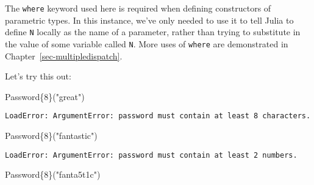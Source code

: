 \documentclass[
  letterpaper,
  DIV=11,
  numbers=noendperiod]{scrreprt}
\newenvironment{Shaded}{\begin{snugshade}}{\end{snugshade}}
\newcommand{\DataTypeTok}[1]{\textcolor[rgb]{0.68,0.00,0.00}{#1}}
\newcommand{\FunctionTok}[1]{\textcolor[rgb]{0.28,0.35,0.67}{#1}}
\newcommand{\NormalTok}[1]{\textcolor[rgb]{0.00,0.23,0.31}{#1}}
\newcommand{\StringTok}[1]{\textcolor[rgb]{0.13,0.47,0.30}{#1}}
\begin{document}
\begin{tcolorbox}[enhanced jigsaw, toprule=.15mm, opacitybacktitle=0.6, leftrule=.75mm, breakable, coltitle=black, bottomrule=.15mm, colbacktitle=quarto-callout-note-color!10!white, bottomtitle=1mm, rightrule=.15mm, title=\textcolor{quarto-callout-note-color}{\faInfo}\hspace{0.5em}{Note}, colframe=quarto-callout-note-color-frame, left=2mm, colback=white, opacityback=0, arc=.35mm, toptitle=1mm, titlerule=0mm]

The \texttt{where} keyword used here is required when defining
constructors of parametric types. In this instance, we've only needed to
use it to tell Julia to define \texttt{N} locally as the name of a
parameter, rather than trying to substitute in the value of some
variable called \texttt{N}. More uses of \texttt{where} are demonstrated
in Chapter~\ref{sec-multipledispatch}.

\end{tcolorbox}

Let's try this out:

\begin{Shaded}
\begin{Highlighting}[]
\FunctionTok{Password}\DataTypeTok{\{8\}}\NormalTok{(}\StringTok{"great"}\NormalTok{)}
\end{Highlighting}
\end{Shaded}

\begin{verbatim}
LoadError: ArgumentError: password must contain at least 8 characters.
\end{verbatim}

\begin{Shaded}
\begin{Highlighting}[]
\FunctionTok{Password}\DataTypeTok{\{8\}}\NormalTok{(}\StringTok{"fantastic"}\NormalTok{)}
\end{Highlighting}
\end{Shaded}

\begin{verbatim}
LoadError: ArgumentError: password must contain at least 2 numbers.
\end{verbatim}

\begin{Shaded}
\begin{Highlighting}[]
\FunctionTok{Password}\DataTypeTok{\{8\}}\NormalTok{(}\StringTok{"fanta5t1c"}\NormalTok{)}
\end{Highlighting}
\end{Shaded}
\end{document}
